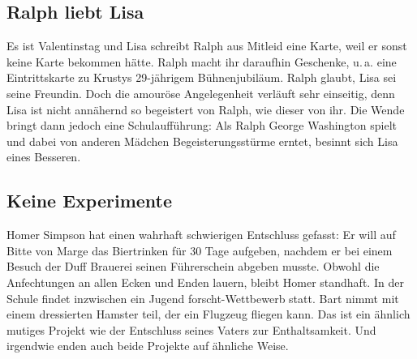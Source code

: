 
	
\subsection{Ralph liebt Lisa}\label{9F13}
Es ist Valentinstag und Lisa schreibt Ralph aus Mitleid eine Karte, weil er sonst keine Karte bekommen hätte. Ralph macht ihr daraufhin Geschenke, u.\,a. eine Eintrittskarte zu Krustys 29-jährigem Bühnenjubiläum. Ralph glaubt, Lisa sei seine Freundin. Doch die amouröse Angelegenheit verläuft sehr einseitig, denn Lisa ist nicht annähernd so begeistert von Ralph, wie dieser von ihr. Die Wende bringt dann jedoch eine Schulaufführung: Als Ralph George Washington spielt und dabei von anderen Mädchen Begeisterungsstürme erntet, besinnt sich Lisa eines Besseren.


	
\subsection{Keine Experimente}
Homer Simpson hat einen wahrhaft schwierigen Entschluss gefasst: Er will auf Bitte von Marge das Biertrinken für 30 Tage aufgeben, nachdem er bei einem Besuch der Duff Brauerei seinen Führerschein abgeben musste. Obwohl die Anfechtungen an allen Ecken und Enden lauern, bleibt Homer standhaft. In der Schule findet inzwischen ein \glqq Jugend forscht\grqq -Wettbewerb statt. Bart nimmt mit einem dressierten Hamster teil, der ein Flugzeug fliegen kann. Das ist ein ähnlich mutiges Projekt wie der Entschluss seines Vaters zur Enthaltsamkeit. Und irgendwie enden auch beide Projekte auf ähnliche Weise.

